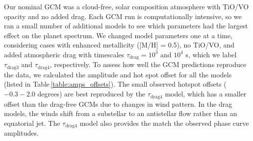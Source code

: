 \documentclass[twocolumn, trackchanges]{aastex61}
\begin{document}
Our nominal GCM was a cloud-free, solar composition atmosphere with TiO/VO opacity and no added drag.  Each GCM run is computationally intensive, so we ran a small number of additional models to see which parameters had the largest effect on the planet spectrum. We changed model parameters one at a time, considering cases with enhanced metallicity ([M/H] = 0.5), no TiO/VO, and added atmospheric drag with timescales $\tau_\mathrm{drag} = 10^3$ and $10^4$ s, which we label $\tau_\mathrm{drag3}$ and $\tau_\mathrm{drag4}$, respectively.  To assess how well the GCM predictions reproduce the data, we calculated the amplitude and hot spot offset for all the models (listed in Table\,\ref{table:amps_offsets}). The small observed hotspot offsets ($-0.3 - 2.0$ degrees) are best reproduced by the $\tau_\mathrm{drag4}$ model, which has a smaller offset than the drag-free GCMs due to changes in wind pattern. In the drag models, the winds shift from a substellar to an antistellar flow rather than an equatorial jet.  The $\tau_\mathrm{drag4}$ model also provides the match the observed phase curve amplitudes. 

\end{document}
